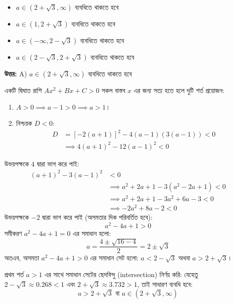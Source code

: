 \documentclass[12pt, a4paper]{article}
\begin{document}
\begin{itemize}[label={}, leftmargin=1cm, itemsep=0.5em]
    \item[\textbf{A)}] $a \in (2+\sqrt{3}, \infty)$ ব্যবধিতে থাকতে হবে
    \item[\textbf{B)}] $a \in (1, 2+\sqrt{3})$ ব্যবধিতে থাকতে হবে
    \item[\textbf{C)}] $a \in (-\infty, 2-\sqrt{3})$ ব্যবধিতে থাকতে হবে
    \item[\textbf{D)}] $a \in (2-\sqrt{3}, 2+\sqrt{3})$ ব্যবধিতে থাকতে হবে
\end{itemize}

\vspace{0.5em}
\begin{tcolorbox}[answerbox]
    \textbf{\color{success} উত্তর:} A) $a \in (2+\sqrt{3}, \infty)$ ব্যবধিতে থাকতে হবে
\end{tcolorbox}
\vspace{1em}

\begin{tcolorbox}[solutionbox={সমাধান (Solution)}]
    \noindent
    একটি দ্বিঘাত রাশি $Ax^2 + Bx + C > 0$ সকল বাস্তব $x$ এর জন্য সত্য হতে হলে দুটি শর্ত প্রয়োজন:
    \begin{enumerate}
        \item $A > 0 \implies a-1 > 0 \implies a > 1$।
        \item নিশ্চয়ক $D < 0$:
        \begin{align*}
            D &= [-2(a+1)]^2 - 4(a-1)(3(a-1)) < 0 \\
            &\implies 4(a+1)^2 - 12(a-1)^2 < 0
        \end{align*}
    \end{enumerate}
    উভয়পক্ষকে $4$ দ্বারা ভাগ করে পাই:
    \begin{align*}
        (a+1)^2 - 3(a-1)^2 &< 0 \\
        &\implies a^2 + 2a + 1 - 3(a^2 - 2a + 1) < 0 \\
        &\implies a^2 + 2a + 1 - 3a^2 + 6a - 3 < 0 \\
        &\implies -2a^2 + 8a - 2 < 0
    \end{align*}
    উভয়পক্ষকে $-2$ দ্বারা ভাগ করে পাই (অসমতার দিক পরিবর্তিত হবে):
    \[ a^2 - 4a + 1 > 0 \]
    সমীকরণ $a^2-4a+1=0$ এর সমাধান হলো:
    \[ a = \frac{4 \pm \sqrt{16-4}}{2} = 2 \pm \sqrt{3} \]
    অতএব, অসমতা $a^2-4a+1 > 0$ এর সমাধান সেট হলো: $a < 2-\sqrt{3}$ অথবা $a > 2+\sqrt{3}$।
    
    প্রথম শর্ত $a > 1$ এর সাথে সমাধান সেটের ছেদবিন্দু (intersection) নির্ণয় করি: যেহেতু $2-\sqrt{3} \approx 0.268 < 1$ এবং $2+\sqrt{3} \approx 3.732 > 1$, তাই সাধারণ ব্যবধি হবে:
    \[ a > 2+\sqrt{3} \text{ বা } a \in (2+\sqrt{3}, \infty) \]
\end{tcolorbox}
\end{document}
